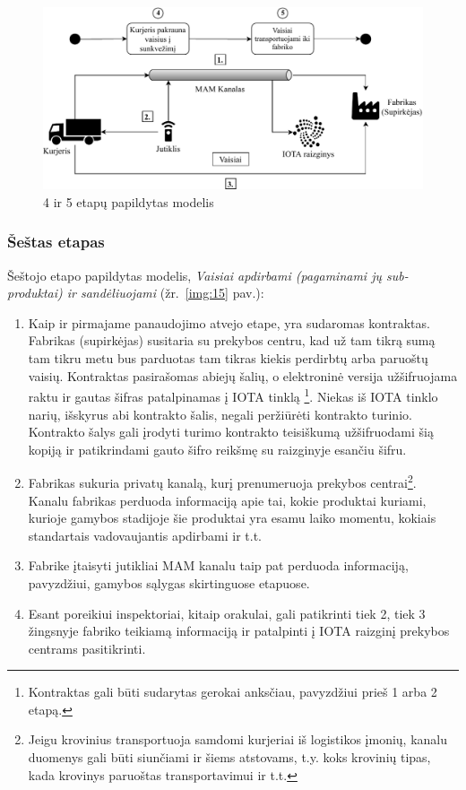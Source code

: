 \begin{figure}[H]
    \centering
    \includegraphics[scale=0.77]{images/iota-usecase-4-5}
    \caption{4 ir 5 etapų papildytas modelis}
    \label{img:14}
\end{figure}




\subsubsection{Šeštas etapas} \label{subsection:uc-6}

Šeštojo etapo papildytas modelis, \textit{Vaisiai apdirbami (pagaminami jų sub-produktai) ir sandėliuojami} (žr.~\ref{img:15} pav.):
\begin{enumerate}
    \item Kaip ir pirmajame panaudojimo atvejo etape, yra sudaromas kontraktas. Fabrikas (supirkėjas) susitaria su prekybos centru, kad už tam tikrą sumą tam tikru metu bus parduotas tam tikras kiekis perdirbtų arba paruoštų vaisių. Kontraktas pasirašomas abiejų šalių, o elektroninė versija užšifruojama raktu ir gautas šifras patalpinamas į IOTA tinklą \footnote{Kontraktas gali būti sudarytas gerokai anksčiau, pavyzdžiui prieš 1 arba 2 etapą.}. Niekas iš IOTA tinklo narių, išskyrus abi kontrakto šalis, negali peržiūrėti kontrakto turinio. Kontrakto šalys gali įrodyti turimo kontrakto teisiškumą užšifruodami šią kopiją ir patikrindami gauto šifro reikšmę su raizginyje esančiu šifru.
    \item Fabrikas sukuria privatų kanalą, kurį prenumeruoja prekybos centrai\footnote{Jeigu krovinius transportuoja samdomi kurjeriai iš logistikos įmonių, kanalu duomenys gali būti siunčiami ir šiems atstovams, t.y. koks krovinių tipas, kada krovinys paruoštas transportavimui ir t.t.}. Kanalu fabrikas perduoda informaciją apie tai, kokie produktai kuriami, kurioje gamybos stadijoje šie produktai yra esamu laiko momentu, kokiais standartais vadovaujantis apdirbami ir t.t.
    \item Fabrike įtaisyti jutikliai MAM kanalu taip pat perduoda informaciją, pavyzdžiui, gamybos sąlygas skirtinguose etapuose.
    \item Esant poreikiui inspektoriai, kitaip orakulai, gali patikrinti tiek 2, tiek 3 žingsnyje fabriko teikiamą informaciją ir patalpinti į IOTA raizginį prekybos centrams pasitikrinti.
\end{enumerate}

